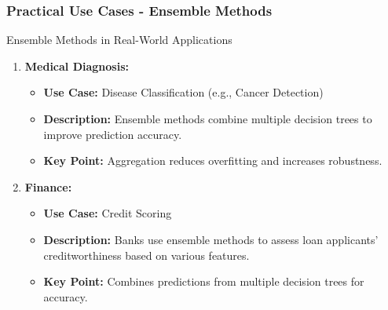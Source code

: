 \documentclass[aspectratio=169]{beamer}
\begin{document}
\begin{frame}[fragile]
    \frametitle{Practical Use Cases - Ensemble Methods}
    \begin{block}{Ensemble Methods in Real-World Applications}
        \begin{enumerate}
            \item \textbf{Medical Diagnosis:}
            \begin{itemize}
                \item \textbf{Use Case:} Disease Classification (e.g., Cancer Detection)
                \item \textbf{Description:} Ensemble methods combine multiple decision trees to improve prediction accuracy.
                \item \textbf{Key Point:} Aggregation reduces overfitting and increases robustness.
            \end{itemize}
            \item \textbf{Finance:}
            \begin{itemize}
                \item \textbf{Use Case:} Credit Scoring
                \item \textbf{Description:} Banks use ensemble methods to assess loan applicants' creditworthiness based on various features.
                \item \textbf{Key Point:} Combines predictions from multiple decision trees for accuracy.
            \end{itemize}
        \end{enumerate}
    \end{block}
\end{frame}
\end{document}
